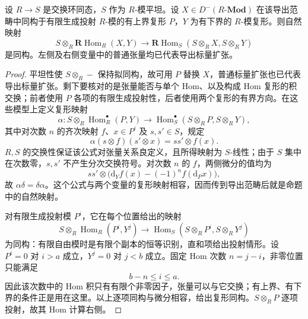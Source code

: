 \begin{proposition}\label{b4:prop:flat-base-change-hom}
	设 \(R\to S\) 是交换环同态，\(S\) 作为 \(R\)-模平坦。设 \(X\in D^-(R\text{-}\mathbf{Mod})\) 在该导出范畴中同构于有限生成投射 \(R\)-模的有上界复形 \(P\)，\(Y\) 为有下界的 \(R\)-模复形。则自然映射
	\[
		S\otimes_R\mathbf R\operatorname{Hom}_R(X,Y) \longrightarrow \mathbf R\operatorname{Hom}_S(S\otimes_RX,S\otimes_RY)
	\]
	是同构。左侧及右侧变量中的普通张量均已代表导出标量扩张。
\end{proposition}
\begin{proof}
	平坦性使 \(S\otimes_R-\) 保持拟同构，故可用 \(P\) 替换 \(X\)，普通标量扩张也已代表导出标量扩张。剩下要核对的是张量能否与单个 Hom、以及构成 Hom 复形的积交换；前者使用 \(P\) 各项的有限生成投射性，后者使用两个复形的有界方向。在这些模型上定义复形映射
	\[
		\alpha:S\otimes_R\operatorname{Hom}_R^\bullet(P,Y) \longrightarrow \operatorname{Hom}_S^\bullet(S\otimes_RP,S\otimes_RY),
	\]
	其中对次数 \(n\) 的齐次映射 \(f\)、\(x\in P^i\) 及 \(s,s'\in S\)，规定
	\[
		\alpha(s\otimes f)(s'\otimes x)=ss'\otimes f(x).
	\]
	\(R,S\) 的交换性保证该公式对张量关系良定义，且所得映射为 \(S\)-线性；由于 \(S\) 集中在次数零，\(s,s'\) 不产生分次交换符号。对次数 \(n\) 的 \(f\)，两侧微分的值均为
	\[
		ss'\otimes\bigl(\mathrm d_Yf(x)-(-1)^nf(\mathrm d_Px)\bigr),
	\]
	故 \(\alpha\delta=\delta\alpha\)。这个公式与两个变量的复形映射相容，因而传到导出范畴后就是命题中的自然映射。

	对有限生成投射模 \(P^i\)，它在每个位置给出的映射
	\[
		S\otimes_R\operatorname{Hom}_R(P^i,Y^j) \longrightarrow \operatorname{Hom}_S(S\otimes_RP^i,S\otimes_RY^j)
	\]
	为同构：有限自由模时是有限个副本的恒等识别，直和项给出投射情形。设 \(P^i=0\) 对 \(i>a\) 成立，\(Y^j=0\) 对 \(j<b\) 成立。固定 Hom 次数 \(n=j-i\)，非零位置只能满足
	\[
		b-n\le i\le a.
	\]
	因此该次数中的 Hom 积只有有限个非零因子，张量可以与它交换；有上界、有下界的条件正是用在这里。以上逐项同构与微分相容，给出复形同构。\(S\otimes_RP\) 逐项投射，故其 Hom 计算右侧。
\end{proof}

